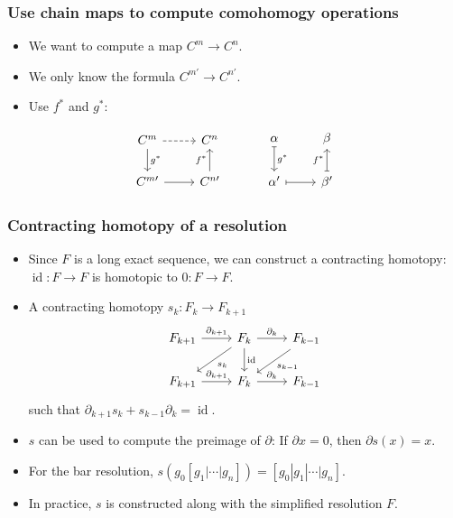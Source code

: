 \documentclass[xcolor=table, aspectratio=169,ignorenonframetext]{beamer}
\DeclareMathOperator{\id}{id}
\begin{document}
\begin{frame}[fragile]
	\frametitle{Use chain maps to compute comohomogy operations}
	\begin{itemize}
		\item We want to compute a map $C^m\rightarrow C^n$.
		\item We only know the formula $C^{m\prime}\rightarrow C^{n\prime}$.
		\item Use $f^\ast$ and $g^\ast$:
	\end{itemize}
	\[\begin{tikzcd}
		C^m\arrow[r,dashrightarrow]\arrow[d,"g^\ast"] & C^n\\
		C^{m\prime}\arrow[r] & C^{n\prime}\arrow[u,"f^\ast"]
	\end{tikzcd}\quad\quad\quad
	\begin{tikzcd}
		\alpha\arrow[d,"g^\ast",mapsto] & \beta\\
		\alpha'\arrow[r,mapsto] & \beta'\arrow[u,"f^\ast",mapsto]
	\end{tikzcd}
	\]
\end{frame}

\begin{frame}[fragile]
	\frametitle{Contracting homotopy of a resolution}
	\begin{itemize}
		\item Since $F$ is a long exact sequence, we can construct a contracting homotopy: $\id:F\rightarrow F$ is homotopic to $0:F\rightarrow F$.
		\item A contracting homotopy $s_k: F_k\rightarrow F_{k+1}$
		\[
		\begin{tikzcd}
		F_{k+1} \arrow[r,"\partial_{k+1}"]
		&F_k\arrow[r,"\partial_k"]
		\arrow[d,"\id"]
		\arrow[ld,"s_k"]&
		F_{k-1}\arrow[ld,"s_{k-1}"]\\
		F_{k+1} \arrow[r,"\partial_{k+1}"]& F_k\arrow[r,"\partial_k"]&
		F_{k-1}
		\end{tikzcd}
		\]
		such that $\partial_{k+1}s_k + s_{k-1}\partial_k = \id$.
		\item $s$ can be used to compute the preimage of $\partial$: If $\partial x=0$, then $\partial s(x) = x$.
		\item For the bar resolution, $s(g_0[g_1|\cdots|g_n])
		=[g_0|g_1|\cdots|g_n]$.
		\item In practice, $s$ is constructed along with the simplified resolution $F$.
	\end{itemize}
\end{frame}
\end{document}
